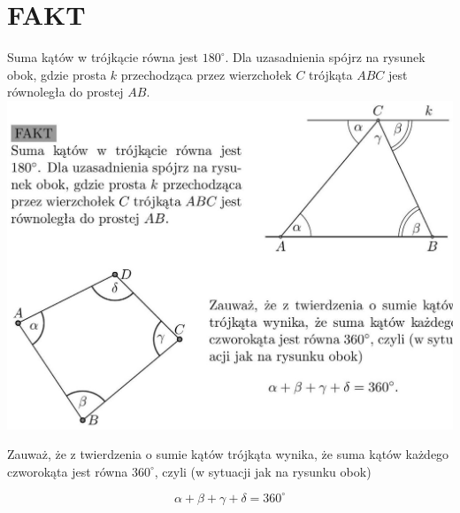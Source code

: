 \documentclass[10pt]{article}
\begin{document}
\section*{FAKT}
Suma kątów w trójkącie równa jest \(180^{\circ}\). Dla uzasadnienia spójrz na rysunek obok, gdzie prosta \(k\) przechodząca przez wierzchołek \(C\) trójkąta \(A B C\) jest równoległa do prostej \(A B\).\\
\includegraphics[max width=\textwidth, center]{2024_11_21_8f01584889ff06348ae7g-190(1)}

Zauważ, że z twierdzenia o sumie kątów trójkąta wynika, że suma kątów każdego czworokąta jest równa \(360^{\circ}\), czyli (w sytuacji jak na rysunku obok)

\[
\alpha+\beta+\gamma+\delta=360^{\circ}
\]
\end{document}
